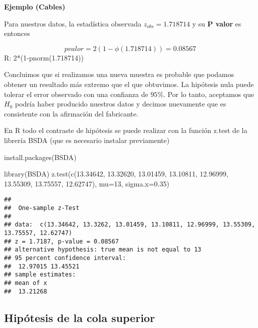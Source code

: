 \documentclass[
]{book}
\newenvironment{Shaded}{\begin{snugshade}}{\end{snugshade}}
\newcommand{\AttributeTok}[1]{\textcolor[rgb]{0.77,0.63,0.00}{#1}}
\newcommand{\DecValTok}[1]{\textcolor[rgb]{0.00,0.00,0.81}{#1}}
\newcommand{\FloatTok}[1]{\textcolor[rgb]{0.00,0.00,0.81}{#1}}
\newcommand{\FunctionTok}[1]{\textcolor[rgb]{0.00,0.00,0.00}{#1}}
\newcommand{\NormalTok}[1]{#1}
\begin{document}
\textbf{Ejemplo (Cables)}

Para nuestros datos, la estadística observada \(z_{obs}=1.718714\) y su \textbf{P valor} es entonces

\[pvalor=2 (1-\phi(1.718714))=0.08567\]
R: 2*(1-pnorm(1.718714))

Concluimos que si realizamos una nueva muestra es probable que podamos obtener un resultado más extremo que el que obtuvimos. La hipótesis nula puede tolerar el error observado con una confianza de \(95\%\). Por lo tanto, aceptamos que \(H_0\) podría haber producido nuestros datos y decimos nuevamente que es consistente con la afirmación del fabricante.

En R todo el contraste de hipótesis se puede realizar con la función z.test de la librería BSDA (que es necesario instalar previamente)

\begin{Shaded}
\begin{Highlighting}[]
\FunctionTok{install.packages}\NormalTok{(BSDA) }
\end{Highlighting}
\end{Shaded}

\begin{Shaded}
\begin{Highlighting}[]
\FunctionTok{library}\NormalTok{(BSDA) }
\FunctionTok{z.test}\NormalTok{(}\FunctionTok{c}\NormalTok{(}\FloatTok{13.34642}\NormalTok{, }\FloatTok{13.32620}\NormalTok{, }\FloatTok{13.01459}\NormalTok{, }\FloatTok{13.10811}\NormalTok{, }
         \FloatTok{12.96999}\NormalTok{, }\FloatTok{13.55309}\NormalTok{, }\FloatTok{13.75557}\NormalTok{, }\FloatTok{12.62747}\NormalTok{), }
       \AttributeTok{mu=}\DecValTok{13}\NormalTok{, }
       \AttributeTok{sigma.x=}\FloatTok{0.35}\NormalTok{)}
\end{Highlighting}
\end{Shaded}

\begin{verbatim}
## 
##  One-sample z-Test
## 
## data:  c(13.34642, 13.3262, 13.01459, 13.10811, 12.96999, 13.55309,     13.75557, 12.62747)
## z = 1.7187, p-value = 0.08567
## alternative hypothesis: true mean is not equal to 13
## 95 percent confidence interval:
##  12.97015 13.45521
## sample estimates:
## mean of x 
##  13.21268
\end{verbatim}

\hypertarget{hipuxf3tesis-de-la-cola-superior}{%
\subsection{Hipótesis de la cola superior}\label{hipuxf3tesis-de-la-cola-superior}}
\end{document}
